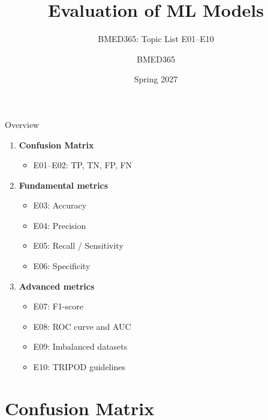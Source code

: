 \documentclass[aspectratio=169, 10pt]{beamer}
\title{Evaluation of ML Models}
\subtitle{BMED365: Topic List E01--E10}
\author{BMED365}
\date{Spring 2027}
\begin{document}
\begin{frame}
    \titlepage
\end{frame}

\begin{frame}{Overview}
    \begin{enumerate}
        \item \textbf{Confusion Matrix}
        \begin{itemize}
            \item E01--E02: TP, TN, FP, FN
        \end{itemize}
        \item \textbf{Fundamental metrics}
        \begin{itemize}
            \item E03: Accuracy
            \item E04: Precision
            \item E05: Recall / Sensitivity
            \item E06: Specificity
        \end{itemize}
        \item \textbf{Advanced metrics}
        \begin{itemize}
            \item E07: F1-score
            \item E08: ROC curve and AUC
            \item E09: Imbalanced datasets
            \item E10: TRIPOD guidelines
        \end{itemize}
    \end{enumerate}
\end{frame}

\section{Confusion Matrix}
\end{document}
